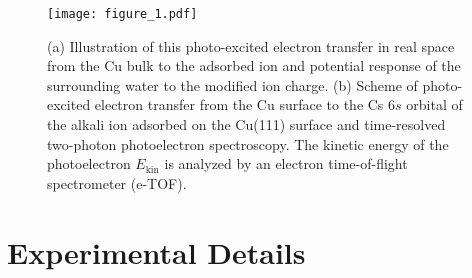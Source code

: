 \documentclass[aps,twocolumn,amssymb,amsfonts,amsmath,showpacs,final,a4paper,superscriptaddress]{revtex4-2}
\begin{document}
\begin{figure}[t]
    \centering
    \texttt{[image: figure\_1.pdf]}
    \caption{(a) Illustration of this photo-excited electron transfer in real space from the Cu bulk to the adsorbed ion and potential response of the surrounding water to the modified ion charge. (b) Scheme of photo-excited electron transfer from the Cu surface to the Cs $6s$ orbital of the alkali ion adsorbed on the Cu(111) surface and time-resolved two-photon photoelectron spectroscopy. The kinetic energy of the photoelectron $E_{\mathrm{kin}}$ is analyzed by an electron time-of-flight spectrometer (e-TOF).}
    \label{fig:fig1}
\end{figure}

\section {Experimental Details}
\end{document}
